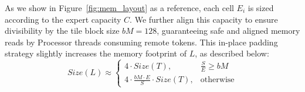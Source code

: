 As we show in Figure~\ref{fig:mem_layout} as a reference, each cell $E_i$ is sized according to the expert capacity $C$. We further align this capacity to ensure divisibility by the tile block size $bM = 128$, guaranteeing safe and aligned memory reads by Processor threads consuming remote tokens. This in-place padding strategy slightly increases the memory footprint of $L$, as described below:
\[
    Size(L) \approx \begin{cases}
        4 \cdot Size(T), & \frac{S}{E} \geq bM \\[1ex]
        4 \cdot \frac{bM \cdot E}{S} \cdot Size(T), & \text{otherwise}
    \end{cases}
\]

